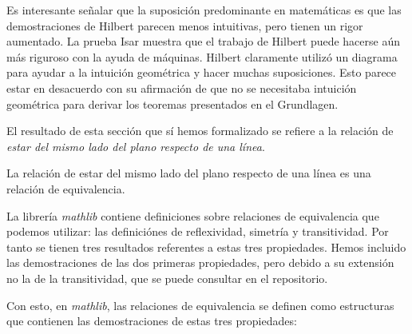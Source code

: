 \begin{displayquote}
	Es interesante señalar que la suposición predominante en matemáticas es que
	las demostraciones de Hilbert parecen menos intuitivas, pero tienen un rigor
	aumentado. La prueba Isar muestra que el trabajo de Hilbert puede hacerse
	aún más riguroso con la ayuda de máquinas. Hilbert claramente utilizó un
	diagrama para ayudar a la intuición geométrica y hacer muchas suposiciones.
	Esto parece estar en desacuerdo con su afirmación de que no se necesitaba
	intuición geométrica para derivar los teoremas presentados en el Grundlagen.
\end{displayquote}

El resultado de esta sección que sí hemos formalizado se refiere a la relación
de \textit{estar del mismo lado del plano respecto de una línea}.

\begin{prop}
	La relación de estar del mismo lado del plano respecto de una línea es una
	relación de equivalencia.
\end{prop}

La librería \textit{mathlib} contiene definiciones sobre relaciones de
equivalencia que podemos utilizar: las definiciónes de reflexividad, simetría y
transitividad. Por tanto se tienen tres resultados referentes a estas tres
propiedades. Hemos incluido las demostraciones de las dos primeras propiedades,
pero debido a su extensión no la de la transitividad, que se puede consultar en
el repositorio.


Con esto, en \textit{mathlib}, las relaciones de equivalencia se definen como
estructuras que contienen las demostraciones de estas tres propiedades:


